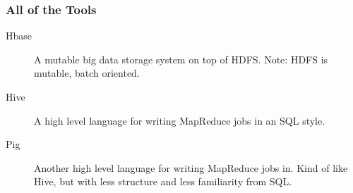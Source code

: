 \documentclass{beamer}
\begin{document}
\begin{frame}
  \frametitle{All of the Tools}
  \begin{description}
    \item[Hbase] A mutable big data storage system on top of HDFS. \alert{Note}: HDFS is mutable, batch oriented.
    \item[Hive] A high level language for writing MapReduce jobs in an SQL style.
    \item[Pig] Another high level language for writing MapReduce jobs in. Kind of like Hive, but with less structure and less familiarity from SQL.
  \end{description}
\end{frame}
\end{document}
